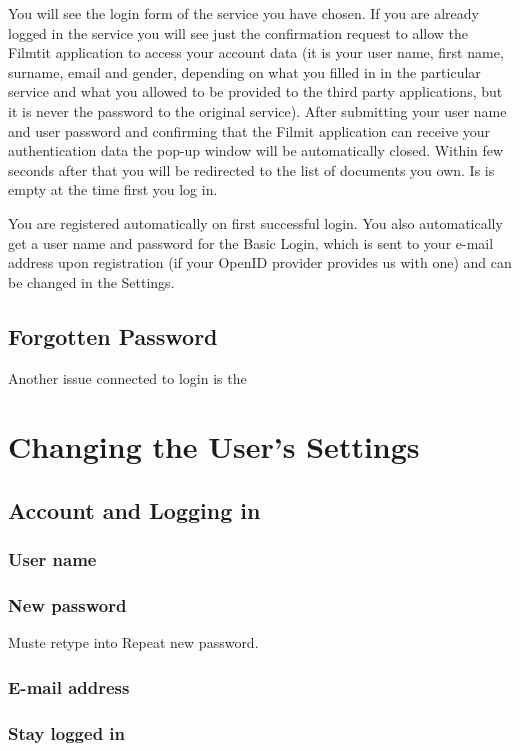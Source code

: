 You will see the login form of the service you have chosen. If you are already logged in the service you will see just the confirmation request to allow the Filmtit application to access your account data (it is your user name, first name, surname, email and gender, depending on what you filled in in the particular service and what you allowed to be provided to the third party applications, but it is never the password to the original service). After submitting your user name and user password and confirming that the Filmit application can receive your authentication data the pop-up window will be automatically closed. Within few seconds after that you will be redirected to the list of documents you own. Is is empty at the time first you log in.

You are registered automatically on first successful login. You also automatically get a user name and password for the Basic Login, which is sent to your e-mail address upon registration (if your OpenID provider provides us with one) and can be changed in the Settings.

\subsection{Forgotten Password}

Another issue connected to login is the 

\section{Changing the User's Settings}
\label{sec:settings}

\subsection{Account and Logging in}
\subsubsection{User name}
\subsubsection{New password}

Muste retype into Repeat new password.

\subsubsection{E-mail address}
\subsubsection{Stay logged in}

